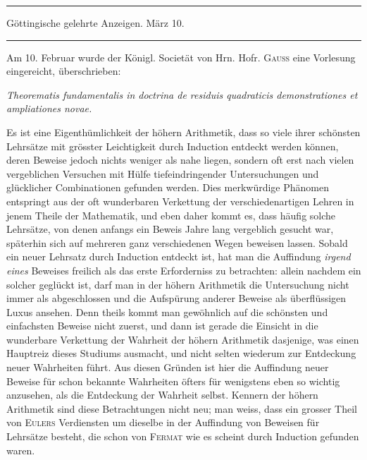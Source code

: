 \clearpage
{}%
\begin{center}
\rule{.82\linewidth}{.35pt}\par
Göttingische gelehrte Anzeigen. März 10.\par
\rule{.82\linewidth}{.35pt}
\end{center}
Am 10. Februar wurde der Königl. Societät von Hrn. Hofr. \textsc{Gauss} eine Vorlesung eingereicht, überschrieben:
\begin{center}\itshape
Theorematis fundamentalis in doctrina de residuis quadraticis demonstrationes et ampliationes novae.
\end{center}

Es ist eine Eigenthümlichkeit der höhern Arithmetik, dass so viele ihrer schönsten Lehrsätze mit grösster Leichtigkeit durch Induction entdeckt werden können, deren Beweise jedoch nichts weniger als nahe liegen, sondern oft erst nach vielen vergeblichen Versuchen mit Hülfe tiefeindringender Untersuchungen und glücklicher Combinationen gefunden werden. Dies merkwürdige Phänomen entspringt aus der oft wunderbaren Verkettung der verschiedenartigen Lehren in jenem Theile der Mathematik, und eben daher kommt es, dass häufig solche Lehrsätze, von denen anfangs ein Beweis Jahre lang vergeblich gesucht war, späterhin sich auf mehreren ganz verschiedenen Wegen beweisen lassen. Sobald ein neuer Lehrsatz durch Induction entdeckt ist, hat man die Auffindung \emph{irgend eines} Beweises freilich als das erste Erforderniss zu betrachten: allein nachdem ein solcher geglückt ist, darf man in der höhern Arithmetik die Untersuchung nicht immer als abgeschlossen und die Aufspürung anderer Beweise als überflüssigen Luxus ansehen. Denn theils kommt man gewöhnlich auf die schönsten und einfachsten
%
Beweise nicht zuerst, und dann ist gerade die Einsicht in die wunderbare Verkettung der Wahrheit der höhern Arithmetik dasjenige, was einen Hauptreiz dieses Studiums ausmacht, und nicht selten wiederum zur Entdeckung neuer Wahrheiten führt. Aus diesen Gründen ist hier die Auffindung neuer Beweise für schon bekannte Wahrheiten öfters für wenigstens eben so wichtig anzusehen, als die Entdeckung der Wahrheit selbst. Kennern der höhern Arithmetik sind diese Betrachtungen nicht neu; man weiss, dass ein grosser Theil von \textsc{Eulers} Verdiensten um dieselbe in der Auffindung von Beweisen für Lehrsätze besteht, die schon von \textsc{Fermat} wie es scheint durch Induction gefunden waren.

